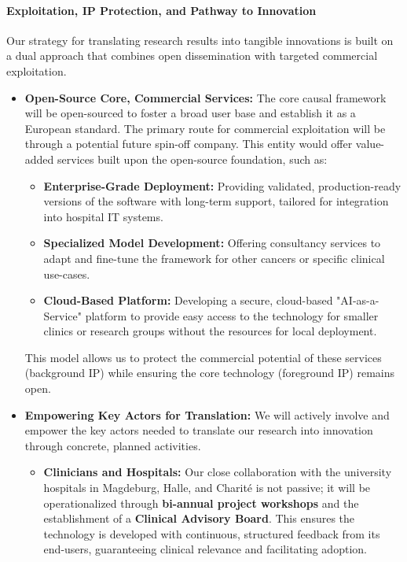 \documentclass[11pt, a4paper]{article}
\begin{document}
\paragraph{Exploitation, IP Protection, and Pathway to Innovation}
Our strategy for translating research results into tangible innovations is built on a dual approach that combines open dissemination with targeted commercial exploitation.
\begin{itemize}
    \item \textbf{Open-Source Core, Commercial Services:} The core causal framework will be open-sourced to foster a broad user base and establish it as a European standard. The primary route for commercial exploitation will be through a potential future spin-off company. This entity would offer value-added services built upon the open-source foundation, such as:
    \begin{itemize}
        \item \textbf{Enterprise-Grade Deployment:} Providing validated, production-ready versions of the software with long-term support, tailored for integration into hospital IT systems.
        \item \textbf{Specialized Model Development:} Offering consultancy services to adapt and fine-tune the framework for other cancers or specific clinical use-cases.
        \item \textbf{Cloud-Based Platform:} Developing a secure, cloud-based "AI-as-a-Service" platform to provide easy access to the technology for smaller clinics or research groups without the resources for local deployment.
    \end{itemize}
    This model allows us to protect the commercial potential of these services (background IP) while ensuring the core technology (foreground IP) remains open.
    \item \textbf{Empowering Key Actors for Translation:} We will actively involve and empower the key actors needed to translate our research into innovation through concrete, planned activities.
    \begin{itemize}
        \item \textbf{Clinicians and Hospitals:} Our close collaboration with the university hospitals in Magdeburg, Halle, and Charité is not passive; it will be operationalized through \textbf{bi-annual project workshops} and the establishment of a \textbf{Clinical Advisory Board}. This ensures the technology is developed with continuous, structured feedback from its end-users, guaranteeing clinical relevance and facilitating adoption.

\end{itemize}
\end{itemize}
\end{document}
